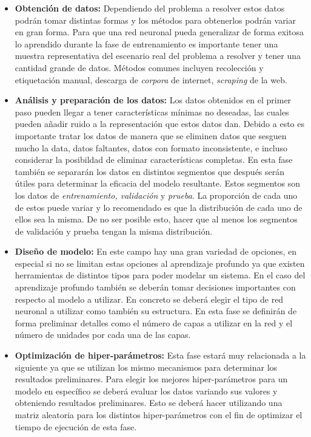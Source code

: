 \begin{itemize}
\item \textbf{Obtención de datos:} Dependiendo del problema a resolver estos datos podrán tomar distintas formas y los métodos para obtenerlos podrán variar en gran forma. Para que una red neuronal pueda generalizar de forma exitosa lo aprendido durante la fase de entrenamiento es importante tener una muestra representativa del escenario real del problema a resolver y tener una cantidad grande de datos. Métodos comunes incluyen recolección y etiquetación manual, descarga de \textit{corpora} de internet, \textit{scraping} de la web.

\item \textbf{Análisis y preparación de los datos:} Los datos obtenidos en el primer paso pueden llegar a tener características mínimas no deseadas, las cuales pueden añadir ruido a la representación que estos datos dan. Debido a esto es importante tratar los datos de manera que se eliminen datos que sesguen mucho la data, datos faltantes, datos con formato inconsistente, e incluso considerar la posibildad de eliminar características completas. En esta fase también se separarán los datos en distintos segmentos que después serán útiles para determinar la eficacia del modelo resultante. Estos segmentos son los datos de \textit{entrenamiento, validación} y \textit{prueba}. La proporción de cada uno de estos puede variar y lo recomendado es que la distribución de cada uno de ellos sea la misma. De no ser posible esto, hacer que al menos los segmentos de validación y prueba tengan la misma distribución.

\item \textbf{Diseño de modelo:} En este campo hay una gran variedad de opciones, en especial si no se limitan estas opciones al aprendizaje profundo ya que existen herramientas de distintos tipos para poder modelar un sistema. En el caso del aprendizaje profundo también se deberán tomar decisiones importantes con respecto al modelo a utilizar. En concreto se deberá elegir el tipo de red neuronal a utilizar como también su estructura. En esta fase se definirán de forma preliminar detalles como el número de capas a utilizar en la red y el número de unidades por cada una de las capas.

\item \textbf{Optimización de hiper-parámetros:} Esta fase estará muy relacionada a la siguiente ya que se utilizan los mismo mecanismos para determinar los resultados preliminares. Para elegir los mejores hiper-parámetros para un modelo en específico se deberá evaluar los datos variando sus valores y obteniendo resultados preliminares. Esto se deberá hacer utilizando una matriz aleatoria para los distintos hiper-parámetros con el fin de optimizar el tiempo de ejecución de esta fase.


\end{itemize}
